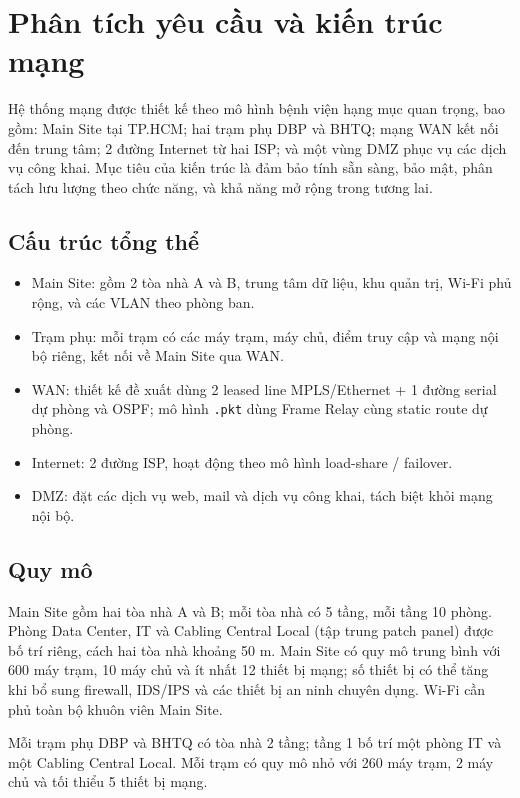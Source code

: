 \section{Phân tích yêu cầu và kiến trúc mạng}

Hệ thống mạng được thiết kế theo mô hình bệnh viện hạng mục quan trọng, bao gồm: Main Site tại TP.HCM; hai trạm phụ DBP và BHTQ; mạng WAN kết nối đến trung tâm; 2 đường Internet từ hai ISP; và một vùng DMZ phục vụ các dịch vụ công khai. Mục tiêu của kiến trúc là đảm bảo tính sẵn sàng, bảo mật, phân tách lưu lượng theo chức năng, và khả năng mở rộng trong tương lai.

\subsection{Cấu trúc tổng thể}

\begin{itemize}
    \item Main Site: gồm 2 tòa nhà A và B, trung tâm dữ liệu, khu quản trị, Wi-Fi phủ rộng, và các VLAN theo phòng ban.
    \item Trạm phụ: mỗi trạm có các máy trạm, máy chủ, điểm truy cập và mạng nội bộ riêng, kết nối về Main Site qua WAN.
    \item WAN: thiết kế đề xuất dùng 2 leased line MPLS/Ethernet + 1 đường serial dự phòng và OSPF; mô hình \texttt{.pkt} dùng Frame Relay cùng static route dự phòng.
    \item Internet: 2 đường ISP, hoạt động theo mô hình load-share / failover.
    \item DMZ: đặt các dịch vụ web, mail và dịch vụ công khai, tách biệt khỏi mạng nội bộ.
\end{itemize}

\subsection{Quy mô}

Main Site gồm hai tòa nhà A và B; mỗi tòa nhà có 5 tầng, mỗi tầng 10 phòng. Phòng Data Center, IT và Cabling Central Local (tập trung patch panel) được bố trí riêng, cách hai tòa nhà khoảng 50 m. Main Site có quy mô trung bình với 600 máy trạm, 10 máy chủ và ít nhất 12 thiết bị mạng; số thiết bị có thể tăng khi bổ sung firewall, IDS/IPS và các thiết bị an ninh chuyên dụng. Wi-Fi cần phủ toàn bộ khuôn viên Main Site.

Mỗi trạm phụ DBP và BHTQ có tòa nhà 2 tầng; tầng 1 bố trí một phòng IT và một Cabling Central Local. Mỗi trạm có quy mô nhỏ với 260 máy trạm, 2 máy chủ và tối thiểu 5 thiết bị mạng.

